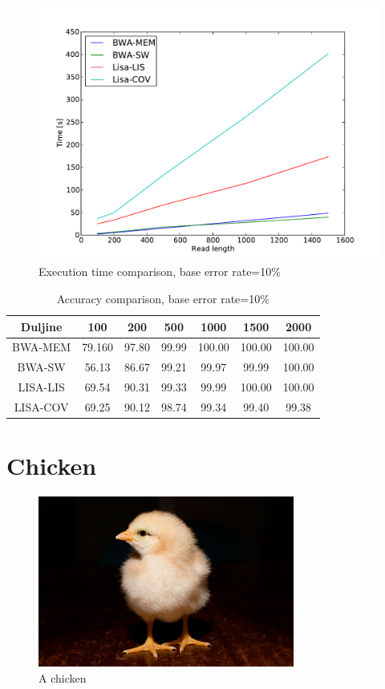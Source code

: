 \documentclass[times, utf8, diplomski]{fer}
\begin{document}
\begin{figure}[H]
\centering
\includegraphics[width=1.0\textwidth]{../img/banana-e10-time.pdf}
\caption{Execution time comparison, base error rate=10\%}\label{banana-e10-time}
\end{figure}

\begin{table}[H]
\centering
\begin{tabular}{|c||c|c|c|c|c|c|}
\hline
	Duljine & 100 & 200 & 500 & 1000 & 1500 & 2000\\
\hline
\hline
	BWA-MEM & 79.160 & 97.80 & 99.99 & 100.00 & 100.00 & 100.00\\
\hline
	BWA-SW  & 56.13 & 86.67 & 99.21 & 99.97 & 99.99 & 100.00\\
\hline
	LISA-LIS   & 69.54 & 90.31 & 99.33 & 99.99 & 100.00 & 100.00\\
\hline
	LISA-COV  & 69.25 & 90.12 & 98.74 & 99.34 & 99.40 & 99.38\\
\hline
\end{tabular}
\caption{Accuracy comparison, base error rate=10\%}\label{banana-e10-correct}
\end{table}


\section{Chicken}

\begin{figure}[H]
\centering
\includegraphics[width=0.75\textwidth]{../img/Day_old_chick_black_background.jpg}
\caption{A chicken}\label{banana}
\end{figure}
\end{document}

